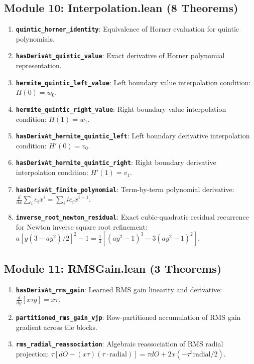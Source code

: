 \documentclass[11pt,a4paper]{article}
\theoremstyle{definition}
\begin{document}
\subsection{Module 10: Interpolation.lean (8 Theorems)}
\begin{enumerate}
    \item \textbf{\texttt{quintic\_horner\_identity}}: Equivalence of Horner evaluation for quintic polynomials.
    \item \textbf{\texttt{hasDerivAt\_quintic\_value}}: Exact derivative of Horner polynomial representation.
    \item \textbf{\texttt{hermite\_quintic\_left\_value}}: Left boundary value interpolation condition: $H(0) = w_0$.
    \item \textbf{\texttt{hermite\_quintic\_right\_value}}: Right boundary value interpolation condition: $H(1) = w_1$.
    \item \textbf{\texttt{hasDerivAt\_hermite\_quintic\_left}}: Left boundary derivative interpolation condition: $H'(0) = v_0$.
    \item \textbf{\texttt{hasDerivAt\_hermite\_quintic\_right}}: Right boundary derivative interpolation condition: $H'(1) = v_1$.
    \item \textbf{\texttt{hasDerivAt\_finite\_polynomial}}: Term-by-term polynomial derivative: $\frac{d}{dx}\sum_i c_i x^i = \sum_i i c_i x^{i-1}$.
    \item \textbf{\texttt{inverse\_root\_newton\_residual}}: Exact cubic-quadratic residual recurrence for Newton inverse square root refinement: $a [y (3 - a y^2)/2]^2 - 1 = \frac{1}{4}[(a y^2 - 1)^3 - 3(a y^2 - 1)^2]$.
\end{enumerate}

\subsection{Module 11: RMSGain.lean (3 Theorems)}
\begin{enumerate}
    \item \textbf{\texttt{hasDerivAt\_rms\_gain}}: Learned RMS gain linearity and derivative: $\frac{d}{dg}[x \tau g] = x \tau$.
    \item \textbf{\texttt{partitioned\_rms\_gain\_vjp}}: Row-partitioned accumulation of RMS gain gradient across tile blocks.
    \item \textbf{\texttt{rms\_radial\_reassociation}}: Algebraic reassociation of RMS radial projection: $\tau [dO - (x \tau)(\tau \cdot \text{radial})] = \tau dO + 2x (-\tau^3 \text{radial}/2)$.
\end{enumerate}
\end{document}
